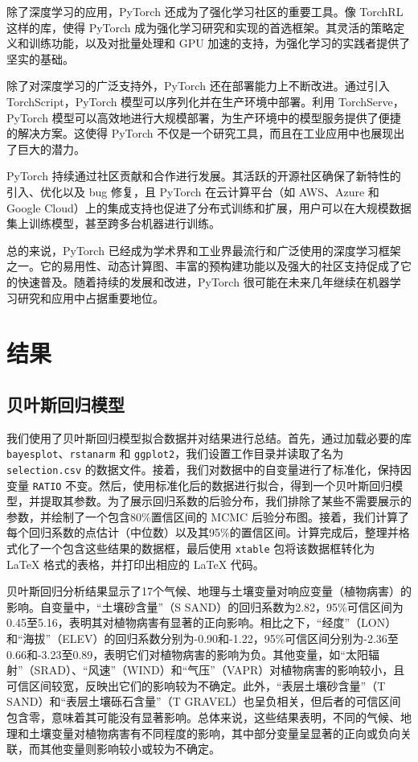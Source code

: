 \documentclass[AutoFakeBold]{LZUThesis-PgD&PhD}
\begin{document}
	除了深度学习的应用，PyTorch 还成为了强化学习社区的重要工具。像 TorchRL 这样的库，使得 PyTorch 成为强化学习研究和实现的首选框架。其灵活的策略定义和训练功能，以及对批量处理和 GPU 加速的支持，为强化学习的实践者提供了坚实的基础。
	
	除了对深度学习的广泛支持外，PyTorch 还在部署能力上不断改进。通过引入 TorchScript，PyTorch 模型可以序列化并在生产环境中部署。利用 TorchServe，PyTorch 模型可以高效地进行大规模部署，为生产环境中的模型服务提供了便捷的解决方案。这使得 PyTorch 不仅是一个研究工具，而且在工业应用中也展现出了巨大的潜力。
	
	PyTorch 持续通过社区贡献和合作进行发展。其活跃的开源社区确保了新特性的引入、优化以及 bug 修复，且 PyTorch 在云计算平台（如 AWS、Azure 和 Google Cloud）上的集成支持也促进了分布式训练和扩展，用户可以在大规模数据集上训练模型，甚至跨多台机器进行训练。
	
	总的来说，PyTorch 已经成为学术界和工业界最流行和广泛使用的深度学习框架之一。它的易用性、动态计算图、丰富的预构建功能以及强大的社区支持促成了它的快速普及。随着持续的发展和改进，PyTorch 很可能在未来几年继续在机器学习研究和应用中占据重要地位。
	
	\chapter{结果}
	
	\section{贝叶斯回归模型}
	我们使用了贝叶斯回归模型拟合数据并对结果进行总结。首先，通过加载必要的库 \texttt{bayesplot}、\texttt{rstanarm} 和 \texttt{ggplot2}，我们设置工作目录并读取了名为 \texttt{selection.csv} 的数据文件。接着，我们对数据中的自变量进行了标准化，保持因变量 \texttt{RATIO} 不变。然后，使用标准化后的数据进行拟合，得到一个贝叶斯回归模型，并提取其参数。为了展示回归系数的后验分布，我们排除了某些不需要展示的参数，并绘制了一个包含80\%置信区间的 MCMC 后验分布图。接着，我们计算了每个回归系数的点估计（中位数）以及其95\%的置信区间。计算完成后，整理并格式化了一个包含这些结果的数据框，最后使用 \texttt{xtable} 包将该数据框转化为 LaTeX 格式的表格，并打印出相应的 LaTeX 代码。
	
	贝叶斯回归分析结果显示了17个气候、地理与土壤变量对响应变量（植物病害）的影响。自变量中，“土壤砂含量”（S SAND）的回归系数为2.82，95\%可信区间为0.45至5.16，表明其对植物病害有显著的正向影响。相比之下，“经度”（LON）和“海拔”（ELEV）的回归系数分别为-0.90和-1.22，95\%可信区间分别为-2.36至0.66和-3.23至0.89，表明它们对植物病害的影响为负。其他变量，如“太阳辐射”（SRAD）、“风速”（WIND）和“气压”（VAPR）对植物病害的影响较小，且可信区间较宽，反映出它们的影响较为不确定。此外，“表层土壤砂含量”（T SAND）和“表层土壤砾石含量”（T GRAVEL）也呈负相关，但后者的可信区间包含零，意味着其可能没有显著影响。总体来说，这些结果表明，不同的气候、地理和土壤变量对植物病害有不同程度的影响，其中部分变量呈显著的正向或负向关联，而其他变量则影响较小或较为不确定。
	
\end{document}
